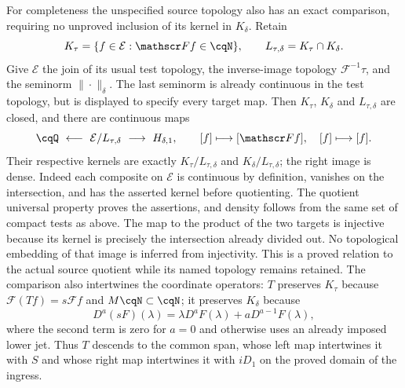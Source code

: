 For completeness the unspecified source topology also has an exact
comparison, requiring no unproved inclusion of its kernel in
$K_\delta$. Retain
\[
 K_\tau=\{f\in\mathcal E:\mathscr Ff\in\cqN\},
 \qquad L_{\tau,\delta}=K_\tau\cap K_\delta.
\]
Give $\mathcal E$ the join of its usual test topology, the
inverse-image topology $\mathscr F^{-1}\tau$, and the seminorm
$\|\cdot\|_\delta$. The last seminorm is already continuous in
the test topology, but is displayed to specify every target map.
Then $K_\tau$, $K_\delta$ and $L_{\tau,\delta}$ are closed, and
there are continuous maps
\begin{equation}\label{eq:cq-sobolev-source-span}
 \cqQ\ \longleftarrow\
 \mathcal E/L_{\tau,\delta}
 \ \longrightarrow\ H_{\delta,1},
 \qquad
 [f]\longmapsto[\mathscr Ff],\quad [f]\longmapsto[f].
\end{equation}
Their respective kernels are exactly
$K_\tau/L_{\tau,\delta}$ and $K_\delta/L_{\tau,\delta}$;
the right image is dense. Indeed each composite on $\mathcal E$
is continuous by definition, vanishes on the intersection, and
has the asserted kernel before quotienting. The quotient universal
property proves the assertions, and density follows from the same
set of compact tests as above. The map to the product of the two
targets is injective because its kernel is precisely the
intersection already divided out. No topological embedding of that
image is inferred from injectivity. This is a proved relation to
the actual source quotient while its named topology remains retained.
The comparison also intertwines the coordinate operators: $T$
preserves $K_\tau$ because $\mathscr F(Tf)=s\mathscr Ff$ and
$M\cqN\subset\cqN$; it preserves $K_\delta$ because
\[
 D^a(sF)(\lambda)=\lambda D^aF(\lambda)
                              +aD^{a-1}F(\lambda),
\]
where the second term is zero for $a=0$ and otherwise uses an
already imposed lower jet. Thus $T$ descends to the common span,
whose left map intertwines it with $S$ and whose right map
intertwines it with $iD_1$ on the proved domain of the ingress.

